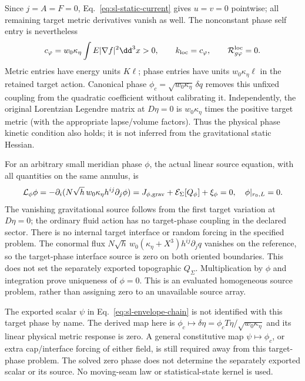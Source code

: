 Since $j=A=F=0$, Eq.~\eqref{eq:sl-static-current} gives $u=v=0$
pointwise; all remaining target metric derivatives vanish as well. The
nonconstant phase self entry is nevertheless
\begin{equation}
 c_\varphi=w_0\kappa_\eta\int E|\nabla f|^2\dd^3x>0,
 \qquad k_{\rm loc}=c_\varphi,
 \qquad \mathcal R_{g\varphi}^{\rm loc}=0 .
 \label{eq:sl-curved-phase}
\end{equation}
Metric entries have energy units $K\ell$; phase entries have units
$w_0\kappa_\eta\ell$ in the retained target action. Canonical phase
$\phi_c=\sqrt{w_0\kappa_\eta}\,\delta q$ removes this unfixed coupling
from the quadratic coefficient without calibrating it. Independently,
the original Lorentzian Legendre matrix at $D\eta=0$ is
$w_0\kappa_\eta$ times the positive target metric (with the appropriate
lapse/volume factors). Thus the physical phase kinetic condition also
holds; it is not inferred from the gravitational static Hessian.

For an arbitrary small meridian phase $\phi$, the actual linear source
equation, with all quantities on the same annulus, is
\begin{equation}
 \mathcal L_\phi\phi
 =-\partial_i(N\sqrt h\,w_0\kappa_\eta h^{ij}\partial_j\phi)
 =J_{\phi,{\rm grav}}+\mathcal E_\Sigma[Q_\phi]+\xi_\phi=0,
 \quad \phi|_{r_0,L}=0 .
 \label{eq:sl-actual-phase-source}
\end{equation}
The vanishing gravitational source follows from the first target variation
at $D\eta=0$; the ordinary fluid action has no target-phase coupling in
the declared sector. There is no internal target interface or random
forcing in the specified problem. The conormal flux
$N\sqrt h\,w_0(\kappa_\eta+X^3)h^{ij}\partial_jq$ vanishes on the
reference, so the target-phase interface source is zero on both oriented
boundaries. This does not set the separately exported topographic $Q_\Sigma$.
Multiplication by $\phi$ and integration prove uniqueness of $\phi=0$.
This is an evaluated homogeneous source problem, rather than assigning
zero to an unavailable source array.

The exported scalar $\psi$ in Eq.~\eqref{eq:sl-envelope-chain} is not
identified with this target phase by name. The derived map here is
$\phi_c\mapsto\delta\eta=\phi_c T\eta/\sqrt{w_0\kappa_\eta}$ and its
linear physical metric response is zero. A general constitutive map
$\psi\mapsto\phi_c$, or extra cap/interface forcing of either field,
is still required away from this target-phase problem. The solved zero
phase does not determine the separately exported scalar or its source.
No moving-seam law or statistical-state kernel is used.

